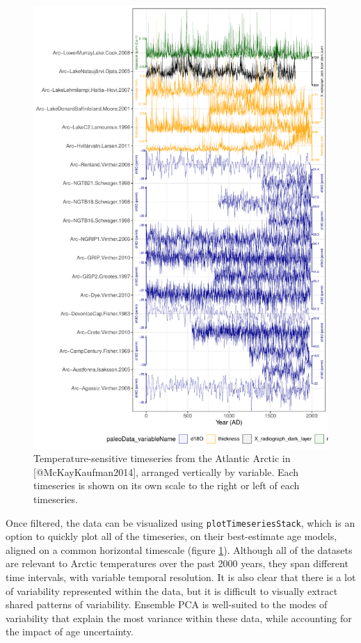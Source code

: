 \documentclass[gchron, manuscript]{copernicus}
\begin{document}
\begin{figure}
\includegraphics[width=12cm]{geoChronR-paper_files/figure-latex/timeseries-stack-1} \caption{Temperature-sensitive timeseries from the Atlantic Arctic in [@McKayKaufman2014], arranged vertically by variable. Each timeseries is shown on its own scale to the right or left of each timeseries.}\label{fig:timeseries-stack}
\end{figure}

Once filtered, the data can be visualized using \texttt{plotTimeseriesStack}, which is an option to quickly plot all of the timeseries, on their best-estimate age models, aligned on a common horizontal timescale (figure \ref{fig:timeseries-stack}).
Although all of the datasets are relevant to Arctic temperatures over the past 2000 years, they span different time intervals, with variable temporal resolution.
It is also clear that there is a lot of variability represented within the data, but it is difficult to visually extract shared patterns of variability.
Ensemble PCA is well-suited to the modes of variability that explain the most variance within these data, while accounting for the impact of age uncertainty.
\end{document}

